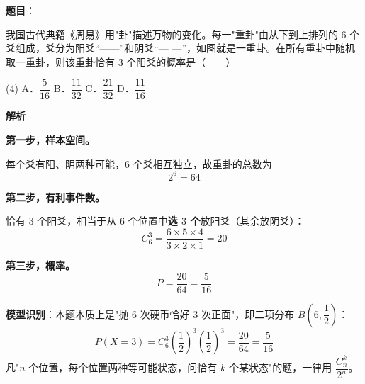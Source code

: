 \begin{answer}

\textbf{题目}：

我国古代典籍《周易》用"卦"描述万物的变化。每一"重卦"由从下到上排列的 $6$ 个爻组成，爻分为阳爻“——”和阴爻“— —”，如图就是一重卦。在所有重卦中随机取一重卦，则该重卦恰有 $3$ 个阳爻的概率是\mbox{（　　）}
\nopagebreak[4]
\begin{center}\end{center}
\nopagebreak[4]
\begin{gkopts}(4)
\task A．$\dfrac5{16}$
\task B．$\dfrac{11}{32}$
\task C．$\dfrac{21}{32}$
\task D．$\dfrac{11}{16}$
\end{gkopts}

\textbf{解析}

\textbf{第一步，样本空间。}

每个爻有阳、阴两种可能，$6$ 个爻相互独立，故重卦的总数为
\nopagebreak[4]
\[2^{6}=64\]

\textbf{第二步，有利事件数。}

恰有 $3$ 个阳爻，相当于从 $6$ 个位置中\textbf{选 $3$ 个}放阳爻（其余放阴爻）：
\nopagebreak[4]
\[C_6^{3}=\frac{6\times5\times4}{3\times2\times1}=20\]

\textbf{第三步，概率。}
\nopagebreak[4]
\[P=\frac{20}{64}=\frac5{16}\]

\begin{gktip}
\textbf{模型识别}：本题本质上是"抛 $6$ 次硬币恰好 $3$ 次正面"，即二项分布 $B\left(6,\dfrac12\right)$：
\nopagebreak[4]
\[P(X=3)=C_6^{3}\left(\frac12\right)^{3}\left(\frac12\right)^{3}=\frac{20}{64}=\frac5{16}\]
凡"$n$ 个位置，每个位置两种等可能状态，问恰有 $k$ 个某状态"的题，一律用 $\dfrac{C_n^{k}}{2^{n}}$。
\end{gktip}


\par\medskip

\end{answer}
